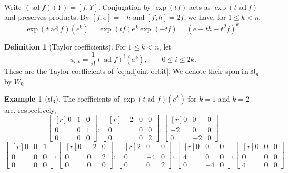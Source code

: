 \documentclass[12pt]{article}
\theoremstyle{definition}
\newtheorem{definition}[theorem]{Definition}
\newtheorem{example}[theorem]{Example}
\theoremstyle{remark}
\DeclareMathOperator{\ad}{ad}
\begin{document}
Write $(\ad f)(Y)=[f,Y]$. Conjugation by $\exp(tf)$ acts as
$\exp(t\ad f)$ and preserves products. By $[f,e]=-h$ and
$[f,h]=2f$, we have, for $1\leq k<n$,
\begin{equation}\label{eq:adjoint-orbit}
 \exp(t\ad f)(e^k)
 =\exp(tf)e^k\exp(-tf)=(e-th-t^2f)^k.
\end{equation}
\begin{definition}[Taylor coefficients]\label{def:taylor-coefficients}
For $1\leq k<n$, let
\begin{equation}\label{eq:basis}
 u_{i,k}=\frac{1}{i!}(\ad f)^i(e^k),\qquad 0\leq i\leq2k.
\end{equation}
These are the Taylor coefficients of \eqref{eq:adjoint-orbit}.
We denote their span in $\mathfrak{sl}_n$ by $W_k$.
\end{definition}

\begin{samepage}
\begin{example}[$\mathfrak{sl}_3$]\label{ex:sl3}
The coefficients of $\exp(t\ad f)(e^k)$ for $k=1$ and $k=2$ are,
respectively,
\begingroup
\setlength{\arraycolsep}{0.25em}
\[
\begin{bmatrix*}[r]
 0&1&0\\0&0&1\\0&0&0
\end{bmatrix*},
\begin{bmatrix*}[r]
 -2&0&0\\0&0&0\\0&0&2
\end{bmatrix*},
\begin{bmatrix*}[r]
 0&0&0\\-2&0&0\\0&-2&0
\end{bmatrix*}
\]
\[
\begin{bmatrix*}[r]
 0&0&1\\0&0&0\\0&0&0
\end{bmatrix*},
\begin{bmatrix*}[r]
 0&-2&0\\0&0&2\\0&0&0
\end{bmatrix*},
\begin{bmatrix*}[r]
 2&0&0\\0&-4&0\\0&0&2
\end{bmatrix*},
\begin{bmatrix*}[r]
 0&0&0\\4&0&0\\0&-4&0
\end{bmatrix*},
\begin{bmatrix*}[r]
 0&0&0\\0&0&0\\4&0&0
\end{bmatrix*}
\]
\endgroup
\end{example}
\end{samepage}
\end{document}
